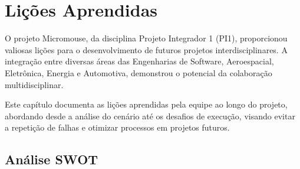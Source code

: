 \chapter{Lições Aprendidas}

O projeto Micromouse, da disciplina Projeto Integrador 1 (PI1), proporcionou  valiosas lições
para o desenvolvimento de futuros projetos interdisciplinares. A integração entre diversas áreas
das Engenharias de Software, Aeroespacial, Eletrônica, Energia e Automotiva, demonstrou o potencial da 
colaboração multidisciplinar.

Este capítulo documenta as lições aprendidas pela equipe ao longo do projeto, abordando desde a análise do cenário até os desafios de execução, visando evitar a repetição de falhas e otimizar processos em projetos futuros.

\section{Análise SWOT}

